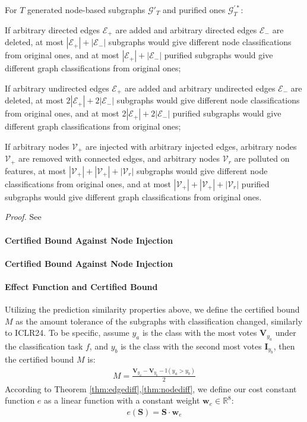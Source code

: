 \begin{theorem}%
\label{thm:nodediff}
 For $T$ generated node-based subgraphs $\mathcal{G}'_T$ and purified ones $\mathcal{G}_T^{'*}$:
 \item If arbitrary directed edges $\mathcal{E}_+$ are added and arbitrary directed edges $\mathcal{E}_-$ are deleted, at most $|\mathcal{E}_+|+|\mathcal{E}_-|$ subgraphs would give different node classifications from original ones, and at most $|\mathcal{E}_+|+|\mathcal{E}_-|$ purified subgraphs would give different graph classifications from original ones; 
  \item If arbitrary undirected edges $\mathcal{E}_+$ are added and arbitrary undirected edges $\mathcal{E}_-$ are deleted, at most $2|\mathcal{E}_+|+2|\mathcal{E}_-|$ subgraphs would give different node classifications from original ones, and at most $2|\mathcal{E}_+|+2|\mathcal{E}_-|$ purified subgraphs would give different graph classifications from original ones; 
 \item If arbitrary nodes $\mathcal{V}_+$ are injected with arbitrary injected edges, arbitrary nodes $\mathcal{V}_+$ are removed with connected edges, and arbitrary nodes $\mathcal{V}_{r}$ are polluted on features, at most $|\mathcal{V}_+|+|\mathcal{V}_+|+|\mathcal{V}_{r}|$ subgraphs would give different node classifications from original ones, and at most $|\mathcal{V}_+|+|\mathcal{V}_+|+|\mathcal{V}_{r}|$ purified subgraphs would give different graph classifications from original ones.
\end{theorem}
\emph{Proof.} See 
\paragraph{Certified Bound Against Node Injection}
\paragraph{Certified Bound Against Node Injection}

\paragraph{Effect Function and Certified Bound} Utilizing the prediction similarity properties above, we define the certified bound $M$ as the amount tolerance of the subgraphs with classification changed, similarly to ICLR24. To be specific, assume $y_{a}$ is the class with the most votes $\mathbf{V}_{y_a}$ under the classification task $f$, and $y_{b}$ is the class with the second most votes $\mathbf{I}_{y_b}$, then the certified bound $M$ is:
\begin{align}
\label{eqn:bound}
    M = \frac{\mathbf{V}_{y_{a}}-\mathbf{V}_{y_b}-\mathbb{I}(y_a>y_b)}{2}
\end{align}
According to Theorem \ref{thm:edgediff},\ref{thm:nodediff}, we define our cost constant function $e$ as a linear function with a constant weight $\mathbf{w}_{e}\in\mathbb{R}^{8}$:
\begin{align}
\label{eqn:effect}
    e(\mathbf{S}) = \mathbf{S}\cdot \mathbf{w}_{e}
\end{align}

